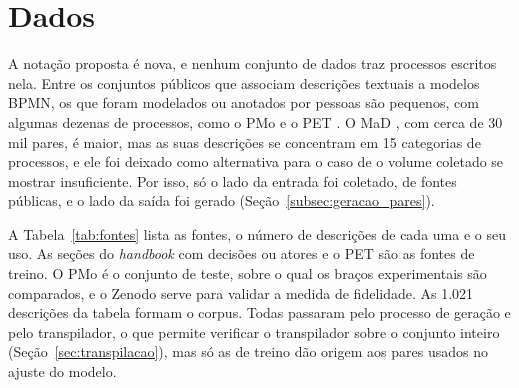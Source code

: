\section{Dados}\label{sec:dados}\label{subsec:contaminacao}

A notação proposta é nova, e nenhum conjunto de dados traz processos escritos nela. Entre os conjuntos públicos que associam descrições textuais a modelos BPMN, os que foram modelados ou anotados por pessoas são pequenos, com algumas dezenas de processos, como o PMo \cite{brissard2025pmo} e o PET \cite{bellan2022pet}. O MaD \cite{li2023mad}, com cerca de 30 mil pares, é maior, mas as suas descrições se concentram em 15 categorias de processos, e ele foi deixado como alternativa para o caso de o volume coletado se mostrar insuficiente. Por isso, só o lado da entrada foi coletado, de fontes públicas, e o lado da saída foi gerado (Seção~\ref{subsec:geracao_pares}).

A Tabela~\ref{tab:fontes} lista as fontes, o número de descrições de cada uma e o seu uso. As seções do \textit{handbook} com decisões ou atores e o PET são as fontes de treino. O PMo é o conjunto de teste, sobre o qual os braços experimentais são comparados, e o Zenodo serve para validar a medida de fidelidade. As 1.021 descrições da tabela formam o corpus. Todas passaram pelo processo de geração e pelo transpilador, o que permite verificar o transpilador sobre o conjunto inteiro (Seção~\ref{sec:transpilacao}), mas só as de treino dão origem aos pares usados no ajuste do modelo.

\begin{table}[htb]
\end{table}


